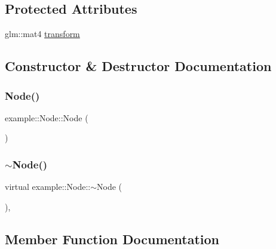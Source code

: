 \subsection*{Protected Attributes}
\begin{DoxyCompactItemize}
\item 
glm\+::mat4 \mbox{\hyperlink{classexample_1_1_node_a98a9bba2771dc273f59d8f1adda2e3e9}{transform}}
\end{DoxyCompactItemize}


\subsection{Constructor \& Destructor Documentation}
\mbox{\label{classexample_1_1_node_a064cdd4ba93aa74cff9f5b037ed84bbf}} 
\subsubsection{\texorpdfstring{Node()}{Node()}}
{\footnotesize\ttfamily example\+::\+Node\+::\+Node (\begin{DoxyParamCaption}{ }\end{DoxyParamCaption})\hspace{0.3cm}{\ttfamily [default]}}

\mbox{\label{classexample_1_1_node_a0d38a83c31d57519fd1df600f1f30e27}} 
\subsubsection{\texorpdfstring{$\sim$\+Node()}{~Node()}}
{\footnotesize\ttfamily virtual example\+::\+Node\+::$\sim$\+Node (\begin{DoxyParamCaption}{ }\end{DoxyParamCaption})\hspace{0.3cm}{\ttfamily [virtual]}, {\ttfamily [default]}}



\subsection{Member Function Documentation}
\mbox{\label{classexample_1_1_node_a67a27b32f8d6211bac54a7ef5e8c8dc6}} 

